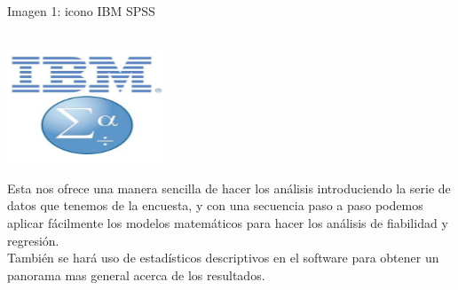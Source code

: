 \documentclass[conference]{IEEEtran}
\begin{document}
   \begin{center}
\caption{Imagen 1: icono IBM SPSS}\\
\includegraphics{imagenes/1}
\end{center}

  Esta nos ofrece una manera sencilla de hacer los análisis introduciendo la serie de datos que tenemos de la encuesta, y con una secuencia paso a paso podemos aplicar fácilmente los modelos matemáticos para hacer los análisis de fiabilidad y regresión.\\    
  
  También se hará uso de estadísticos descriptivos en el software para obtener un panorama mas general acerca de los resultados.\\
\end{document}
